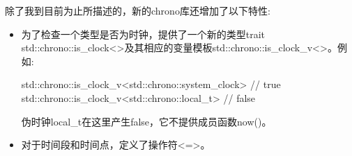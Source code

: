 除了我到目前为止所描述的，新的chrono库还增加了以下特性:


\begin{itemize}
\item 
为了检查一个类型是否为时钟，提供了一个新的类型trait std::chrono::is\_clock<>及其相应的变量模板std::chrono::is\_clock\_v<>。例如:

\begin{cpp}
std::chrono::is_clock_v<std::chrono::system_clock> // true
std::chrono::is_clock_v<std::chrono::local_t> // false
\end{cpp}

伪时钟local\_t在这里产生false，它不提供成员函数now()。

\item 
对于时间段和时间点，定义了操作符<=>。
\end{itemize}